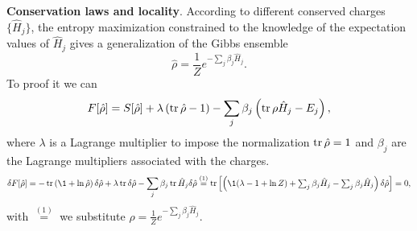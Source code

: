\textbf{Conservation laws and locality}. According to different conserved charges $\{\hat{H}_j\}$,  the entropy maximization constrained
to the knowledge of the expectation values of $\hat{H}_j$  gives a generalization of the Gibbs ensemble
\begin{equation*}
	\hat{\rho} = \frac{1}{Z} e^{- \sum_j \beta_j \hat{H}_j}.
\end{equation*}
To proof it we can
\begin{equation*}
	F[\hat{\rho}] = S[\hat{\rho}] + \lambda \left(\mathop{\mathrm{tr}}\nolimits \hat{\rho} - 1\right) - \sum_j \beta_j \left(
		\mathop{\mathrm{tr}}\nolimits \rho \hat{H}_j - E_j
	\right),
\end{equation*}
where $\lambda$ is a Lagrange multiplier to impose the normalization $\mathop{\mathrm{tr}}\nolimits \hat{\rho} = 1$ and $\beta_j$ are the Lagrange multipliers associated with the charges.
\begin{equation*}
	\delta F[\hat{\rho}] = - \tr \left(\1 + \ln \hat{\rho}\right) \delta \hat{\rho} + \lambda \tr \delta \hat{\rho} - \sum_j \beta_j 
		\tr \hat{H}_j \delta \hat{\rho}
	 \overset{(1)}{=}  \tr\left[\left(
		\1 (\lambda - 1 + \ln Z)  + \textstyle \sum_j \beta_j \hat{H}_j - \textstyle \sum_j \beta_j \hat{H}_j
	\right) \delta \hat{\rho}\right] = 0,
\end{equation*}
with $\overset{(1)}{=}$ we substitute $\rho = \frac{1}{Z} e^{- \sum_j \beta_j \hat{H}_j}$.

